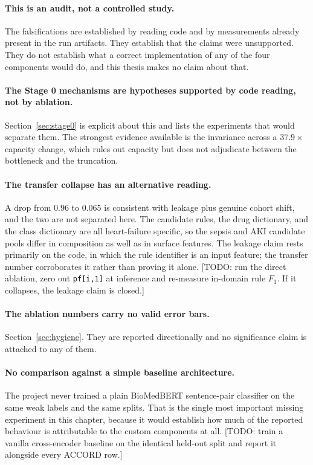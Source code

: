 \paragraph{This is an audit, not a controlled study.} The falsifications are
established by reading code and by measurements already present in the run
artifacts. They establish that the claims were unsupported. They do not
establish what a correct implementation of any of the four components would do,
and this thesis makes no claim about that.

\paragraph{The Stage 0 mechanisms are hypotheses supported by code reading, not
by ablation.} Section~\ref{sec:stage0} is explicit about this and lists the
experiments that would separate them. The strongest evidence available is the
invariance across a $37.9\times$ capacity change, which rules out capacity but
does not adjudicate between the bottleneck and the truncation.

\paragraph{The transfer collapse has an alternative reading.} A drop from $0.96$
to $0.065$ is consistent with leakage plus genuine cohort shift, and the two are
not separated here. The candidate rules, the drug dictionary, and the class
dictionary are all heart-failure specific, so the sepsis and AKI candidate pools
differ in composition as well as in surface features. The leakage claim rests
primarily on the code, in which the rule identifier is an input feature; the
transfer number corroborates it rather than proving it alone.
[TODO: run the direct ablation, zero out \texttt{pf[i,1]} at inference and
re-measure in-domain rule $F_1$. If it collapses, the leakage claim is closed.]

\paragraph{The ablation numbers carry no valid error bars.}
Section~\ref{sec:hygiene}. They are reported directionally and no significance
claim is attached to any of them.

\paragraph{No comparison against a simple baseline architecture.} The project
never trained a plain BioMedBERT sentence-pair classifier on the same weak
labels and the same splits. That is the single most important missing
experiment in this chapter, because it would establish how much of the reported
behaviour is attributable to the custom components at all.
[TODO: train a vanilla cross-encoder baseline on the identical held-out split
and report it alongside every ACCORD row.]

